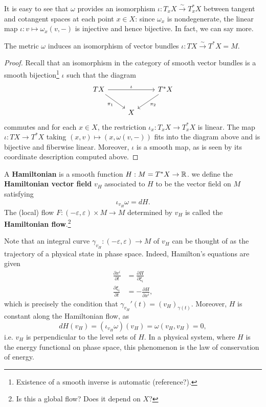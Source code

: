 \documentclass{amsart}
\begin{document}
It is easy to see that $\omega$ provides an isomorphism $\iota:T_xX\xrightarrow{\sim} T_x^*X$
between tangent and cotangent spaces at each point $x\in X$: since $\omega_x$ is nondegenerate, the linear
map $\iota:v\mapsto \omega_x(v,-)$ is injective and hence bijective. In fact, we can say more.

\begin{proposition}
    The metric $\omega$ induces an isomorphism of vector bundles $\iota:TX\xrightarrow{\sim}T^*X=M$.
\end{proposition}
\begin{proof}
    Recall that an isomorphism in the category of smooth vector bundles is a smooth
    bijection\footnote{Existence of a smooth inverse is automatic (reference?).}
    $\iota$ such that the diagram
    \begin{equation*}
        \begin{tikzcd}
            TX\ar{rr}{\iota}\ar[swap]{rd}{\pi_1} & & T^*X\ar{ld}{\pi_2}\\
            & X
        \end{tikzcd}
    \end{equation*}
    commutes and for each $x\in X$, the restriction $\iota_x:T_xX\to T^*_xX$ is linear.
    The map $\iota:TX\to T^*X$ taking $(x,v)\mapsto (x,\omega(v,-))$ fits into the diagram above
    and is bijective and fiberwise linear. Moreover, $\iota$ is a smooth map, as is seen by
    its coordinate description computed above.
\end{proof}

\begin{definition}
    A \textbf{Hamiltonian} is a smooth function $H:M=T^*X\to\mathbb{R}$.
    we define the \textbf{Hamiltonian vector field} $v_H$ associated to $H$ to be the vector
    field on $M$ satisfying
    \begin{equation*}
        \iota_{v_H}\omega = dH.
    \end{equation*}
    The (local) flow $F:(-\varepsilon,\varepsilon)\times M\to M$ determined by $v_H$ is
    called the \textbf{Hamiltonian flow}.\footnote{Is this a global flow? Does it depend on $X$?}
\end{definition}

Note that an integral curve $\gamma_{v_H}:(-\varepsilon,\varepsilon)\to M$ of $v_H$ can be thought
of as the trajectory of a physical state in phase space. Indeed, Hamilton's equations are given
\begin{align*}
    \frac{\partial x^i}{\partial t} &= \frac{\partial H}{\partial \xi_i} \\
    \frac{\partial \xi_i}{\partial t} &= - \frac{\partial H}{\partial x^i},
\end{align*}
which is precisely the condition that $\gamma_{v_H}'(t)=(v_H)_{\gamma(t)}$. Moreover, $H$ is
constant along the Hamiltonian flow, as
\begin{equation*}
    dH(v_H) = (\iota_{v_H}\omega)(v_H)=\omega(v_H,v_H) = 0,
\end{equation*}
i.e. $v_H$ is perpendicular to the level sets of $H$. In a physical system, where $H$ is the
energy functional on phase space, this phenomenon is the law of conservation of energy.
\end{document}
